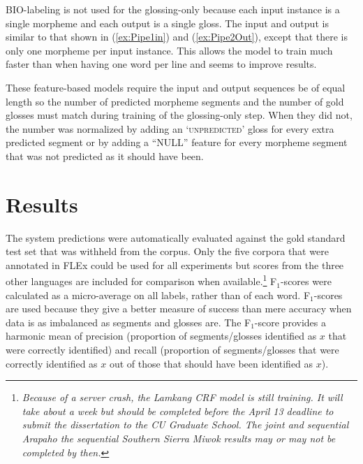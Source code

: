 BIO-labeling is not used for the glossing-only because each input instance is a single morpheme and each output is a single gloss. The input and output is similar to that shown in (\ref{ex:Pipe1in}) and (\ref{ex:Pipe2Out}), except that there is only one morpheme per input instance. This allows the model to train much faster than when having one word per line and seems to improve results.

These feature-based models require the input and output sequences be of equal length so the number of predicted morpheme segments and the number of gold glosses must match during training of the glossing-only step. When they did not, the number was normalized by adding an `\textsc{unpredicted}' gloss for every extra predicted segment or by adding a ``NULL'' feature for every morpheme segment that was not predicted as it should have been. 


\section{Results}
\label{sec:sgresults}

The system predictions were automatically evaluated against the gold standard test set that was withheld from the corpus. Only the five corpora that were annotated in FLEx could be used for all experiments but scores from the three other languages are included for comparison when available.\footnote{\textit{Because of a server crash, the Lamkang CRF model is still training. It will take about a week but should be completed before the April 13 deadline to submit the dissertation to the CU Graduate School. The joint and sequential Arapaho the sequential Southern Sierra Miwok results may or may not be completed by then.}} F$_1$-scores were calculated as a micro-average on all labels, rather than of each word. F$_1$-scores are used because they give a better measure of success than mere accuracy when data is as imbalanced as segments and glosses are. The F$_1$-score provides a harmonic mean of precision (proportion of segments/glosses identified as $x$ that were correctly identified) and recall (proportion of segments/glosses that were correctly identified as $x$ out of those that should have been identified as $x$). 


